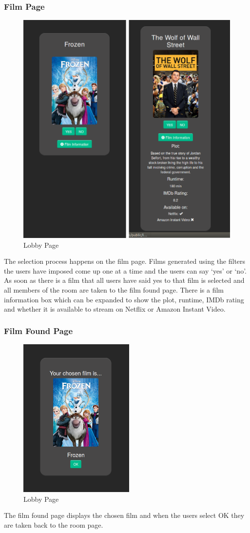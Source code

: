 \documentclass{article}
\begin{document}
\subsubsection{Film Page}
\begin{figure}[H]
\centering
\caption{Lobby Page}
\label{sec:sysarchitecture}
\includegraphics[scale=0.5]{filmpage}
\end{figure}
The selection process happens on the film page. Films generated using the filters the users have imposed come up one at a time and the users can say ‘yes’ or ‘no’. As soon as there is a film that all users have said yes to that film is selected and all members of the room are taken to the film found page. There is a film information box which can be expanded to show the plot, runtime, IMDb rating and whether it is available to stream on Netflix or Amazon Instant Video. 
\subsubsection{Film Found Page}
\begin{figure}[H]
\centering
\caption{Lobby Page}
\label{sec:sysarchitecture}
\includegraphics[scale=0.5]{filmfoundpage}
\end{figure}
The film found page displays the chosen film and when the users select OK they are taken back to the room page.
\end{document}
